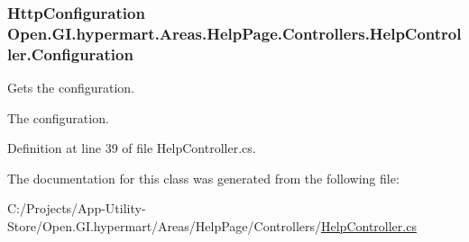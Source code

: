 \subsubsection[{Configuration}]{\setlength{\rightskip}{0pt plus 5cm}Http\+Configuration Open.\+G\+I.\+hypermart.\+Areas.\+Help\+Page.\+Controllers.\+Help\+Controller.\+Configuration\hspace{0.3cm}{\ttfamily [get]}}\label{class_open_1_1_g_i_1_1hypermart_1_1_areas_1_1_help_page_1_1_controllers_1_1_help_controller_ac1327fb5827701100fa4e1b3566fd752}


Gets the configuration. 

The configuration. 

Definition at line 39 of file Help\+Controller.\+cs.



The documentation for this class was generated from the following file\+:\begin{DoxyCompactItemize}
\item 
C\+:/\+Projects/\+App-\/\+Utility-\/\+Store/\+Open.\+G\+I.\+hypermart/\+Areas/\+Help\+Page/\+Controllers/\hyperlink{_help_controller_8cs}{Help\+Controller.\+cs}\end{DoxyCompactItemize}
